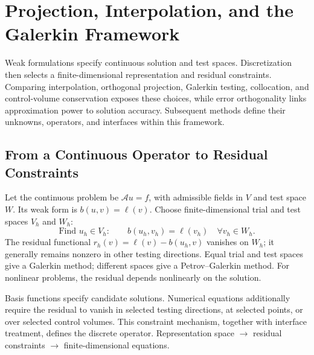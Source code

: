 \chapter{Projection, Interpolation, and the Galerkin Framework}\label{ch:6}
\begin{chaptersummary}
Weak formulations specify continuous solution and test spaces. Discretization then selects a finite-dimensional representation and residual constraints. Comparing interpolation, orthogonal projection, Galerkin testing, collocation, and control-volume conservation exposes these choices, while error orthogonality links approximation power to solution accuracy. Subsequent methods define their unknowns, operators, and interfaces within this framework.
\end{chaptersummary}

\section{From a Continuous Operator to Residual Constraints}
Let the continuous problem be $\mathcal A u=f$, with admissible fields in $V$ and test space $W$.
Its weak form is $b(u,v)=\ell(v)$.
Choose finite-dimensional trial and test spaces $V_h$ and $W_h$:
\begin{equation}\label{eq:galerkin-general}
\text{Find }u_h\in V_h:\qquad b(u_h,v_h)=\ell(v_h)
\quad\forall v_h\in W_h.
\end{equation}
The residual functional $r_h(v)=\ell(v)-b(u_h,v)$ vanishes on $W_h$;
it generally remains nonzero in other testing directions. Equal trial and test spaces give a Galerkin method;
different spaces give a Petrov--Galerkin method. For nonlinear problems, the residual depends nonlinearly on the solution.

{Basis functions specify candidate solutions. Numerical equations additionally require the residual to vanish in selected testing directions, at selected points, or over selected control volumes. This constraint mechanism, together with interface treatment, defines the discrete operator.}
{Representation space $\longrightarrow$ residual constraints $\longrightarrow$ finite-dimensional equations.}

